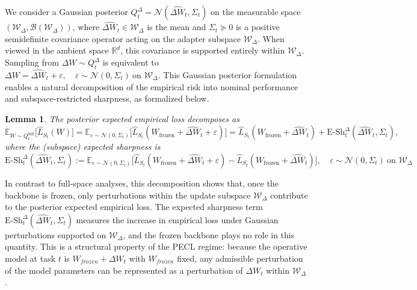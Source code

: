 \documentclass[10pt]{article} %
\newtheorem{lemma}{Lemma}
\begin{document}
We consider a Gaussian posterior \( Q_t^{\Delta} = \mathcal{N}(\hat{\Delta W}_t, \Sigma_t) \) on the measurable space \( (\mathcal{W}_\Delta, \mathcal{B}(\mathcal{W}_\Delta)) \), where \( \hat{\Delta W}_t \in \mathcal{W}_\Delta \) is the mean and \( \Sigma_t \succeq 0 \) is a positive semidefinite covariance operator acting on the adapter subspace \( \mathcal{W}_\Delta \). When viewed in the ambient space \( \mathbb{R}^d \), this covariance is supported entirely within \( \mathcal{W}_\Delta \). Sampling from \( \Delta W \sim Q_t^{\Delta} \) is equivalent to 
$
\Delta W = \hat{\Delta W}_t + \varepsilon, \quad \varepsilon \sim \mathcal{N}(0, \Sigma_t) \ \text{on } \mathcal{W}_\Delta.
$ This Gaussian posterior formulation enables a natural decomposition of the empirical risk into nominal performance and subspace-restricted sharpness, as formalized below.

\begin{lemma}
\label{lemma: subspace-full}
    The posterior expected empirical loss decomposes as
\begin{equation}
    \mathbb{E}_{W\sim Q_t^{\mathrm{full}}}\big[\hat{L}_{S_t}(W)\big]
= \mathbb{E}_{\varepsilon\sim\mathcal N(0,\Sigma_t)}
    \big[\hat{L}_{S_t}(W_\mathrm {frozen }+\hat{\Delta W}_t+\varepsilon)\big]
= \hat{L}_{S_t}(W_\mathrm {frozen }+\hat{\Delta W}_t)
  + \mathrm{E\text{-}Sh}_t^{\Delta}(\hat{\Delta W}_t,\Sigma_t),
\end{equation}
where the (subspace) expected sharpness is
$$
\mathrm{E\text{-}Sh}_t^{\Delta}(\hat{\Delta W}_t,\Sigma_t)
:= \mathbb{E}_{\varepsilon\sim\mathcal N(0,\Sigma_t)}
   \big[\hat{L}_{S_t}(W_\mathrm {frozen }+\hat{\Delta W}_t+\varepsilon)
       - \hat{L}_{S_t}(W_\mathrm {frozen }+\hat{\Delta W}_t)\big],\quad
\varepsilon\sim\mathcal N(0,\Sigma_t)\ \text{on } \mathcal W_\Delta$$
\end{lemma}

In contrast to full-space analyses, this decomposition shows that, once the backbone is frozen, only perturbations within the update subspace $\mathcal{W}_{\Delta}$ contribute to the posterior expected empirical loss. The expected sharpness term $\mathrm{E\text{-}Sh}_t^{\Delta}(\hat{\Delta W}_t,\Sigma_t)$ measures the increase in empirical loss under Gaussian perturbations supported on $\mathcal{W}_{\Delta}$, and the frozen backbone plays no role in this quantity. This is a structural property of the PECL regime: because the operative model at task $t$ is \(W_{{frozen}}+\Delta W_t\) with $W_{{frozen}}$ fixed, any admissible perturbation of the model parameters can be represented as a perturbation of $\Delta W_t$ within $\mathcal{W}_{\Delta}$.
\end{document}
